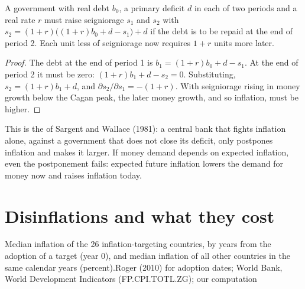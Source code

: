 \begin{proposition}\label{prop:b3:inflation-evidence:arithmetic}
A government with real debt $b_0$, a primary deficit $d$ in each of two periods and a
real rate $r$ must raise seigniorage $s_1$ and $s_2$ with $s_2 = (1 + r)\big((1 + r)b_0 + d - s_1\big) + d$ if
the debt is to be repaid at the end of period 2. Each unit less of seigniorage now
requires $1 + r$ units more later.
\end{proposition}

\begin{proof}
The debt at the end of period 1 is $b_1 = (1 + r)b_0 + d - s_1$. At the end of period 2 it must
be zero: $(1 + r)b_1 + d - s_2 = 0$. Substituting, $s_2 = (1 + r)b_1 + d$, and $\partial s_2/\partial s_1 = -(1 + r)$. With
seigniorage rising in money growth below the Cagan peak, the later money growth,
and so inflation, must be higher.
\end{proof}

This is the  of Sargent and Wallace (1981): a central bank
that fights inflation alone, against a government that does not close its deficit, only postpones
inflation and makes it larger. If money demand depends on expected inflation, even
the postponement fails: expected future inflation lowers the demand for money now
and raises inflation today.

\section{Disinflations and what they cost}\label{sec:b3:inflation-evidence:disinflation}

\begin{omchart}{Median inflation of the 26 inflation-targeting countries, by years from
the adoption of a target (year 0), and median inflation of all other countries in the
same calendar years (percent).}{Roger (2010) for adoption dates; World Bank, World
Development Indicators (FP.CPI.TOTL.ZG); our computation}
\end{omchart}


